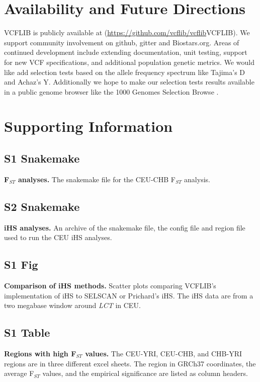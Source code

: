 \documentclass[10pt,letterpaper]{article}
\begin{document}
\section*{Availability and Future Directions}

VCFLIB is publicly available at (\url{https://github.com/vcflib/vcflib}{VCFLIB}).  We support community involvement on github, gitter and Biostars.org.  Areas of continued development include extending documentation, unit testing,  support for new VCF specifications, and additional population genetic metrics.  We would like add selection tests based on the allele frequency spectrum like Tajima's D and Achaz's Y\cite{achaz}.  Additionally we hope to make our selection tests results available in a public genome browser like the 1000 Genomes Selection Browse \cite{pybus}.



\section*{Supporting Information}

\subsection*{S1 Snakemake}
\label{S1_snakemake}
{\bf  F$_{ST}$  analyses.}  The snakemake file for the CEU-CHB  F$_{ST}$  analysis.  

\subsection*{S2 Snakemake}
\label{S2_snakemake}
{\bf iHS analyses.}  An archive of the snakemake file, the config file and region file used to run the CEU iHS analyses.

\subsection*{S1 Fig}
\label{S1_Fig}
{\bf Comparison of iHS methods.}  Scatter plots comparing VCFLIB's implementation of iHS to SELSCAN or Prichard's iHS. The iHS data are from a two megabase window around \textit{LCT} in CEU.

\subsection*{S1 Table}
\label{S1_Table}
{\bf Regions with high  F$_{ST}$  values.} The CEU-YRI, CEU-CHB, and CHB-YRI regions are in three different excel sheets.  The region in GRCh37 coordinates, the average  F$_{ST}$  values, and the empirical significance are listed as column headers.
\end{document}
